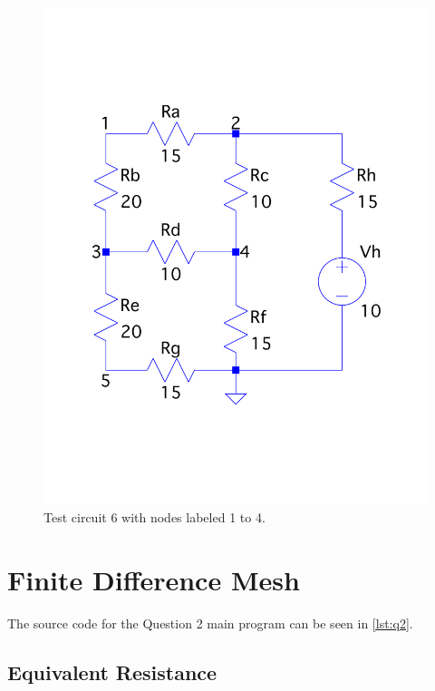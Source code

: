 \documentclass[a4paper,titlepage]{article}
\begin{document}
	\begin{figure}[!htb]
		\centering
		\includegraphics[width=0.75\columnwidth]{plots/q1_circuit_6.pdf}
		\caption
		{Test circuit 6 with nodes labeled 1 to 4.}
		\label{fig:q1_circuit_6}
	\end{figure}
	
	
	\section{Finite Difference Mesh}
	
	The source code for the Question 2 main program can be seen in \autoref{lst:q2}.
	
	\subsection{Equivalent Resistance}
	
\end{document}
